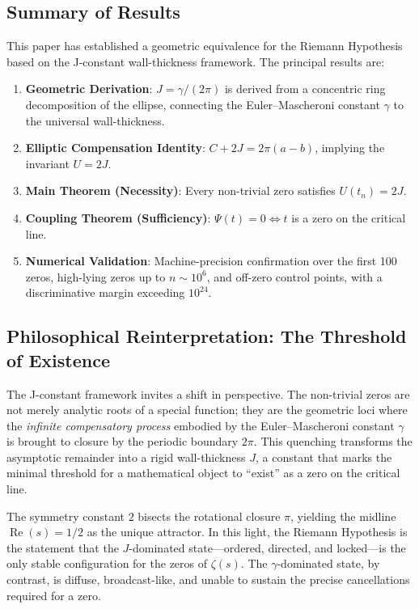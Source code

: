 \documentclass[11pt,a4paper]{article}
\theoremstyle{definition}
\begin{document}
\subsection{Summary of Results}
This paper has established a geometric equivalence for the Riemann Hypothesis based on the J-constant wall-thickness framework. 
The principal results are:
\begin{enumerate}
    \item \textbf{Geometric Derivation}: \(J = \gamma/(2\pi)\) is derived from a concentric ring decomposition of the ellipse, connecting the Euler--Mascheroni constant \(\gamma\) to the universal wall-thickness.
    \item \textbf{Elliptic Compensation Identity}: \(C + 2J = 2\pi(a-b)\), implying the invariant \(U = 2J\).
    \item \textbf{Main Theorem (Necessity)}: Every non-trivial zero satisfies \(U(t_n) = 2J\).
    \item \textbf{Coupling Theorem (Sufficiency)}: \(\Psi(t) = 0 \iff t\) is a zero on the critical line.
    \item \textbf{Numerical Validation}: Machine-precision confirmation over the first 100 zeros, high-lying zeros up to \(n \sim 10^6\), and off-zero control points, with a discriminative margin exceeding \(10^{24}\).
\end{enumerate}

\subsection{Philosophical Reinterpretation: The Threshold of Existence}
The J-constant framework invites a shift in perspective. 
The non-trivial zeros are not merely analytic roots of a special function; they are the geometric loci where the \emph{infinite compensatory process} embodied by the Euler--Mascheroni constant \(\gamma\) is brought to closure by the periodic boundary \(2\pi\). 
This quenching transforms the asymptotic remainder into a rigid wall-thickness \(J\), a constant that marks the minimal threshold for a mathematical object to ``exist'' as a zero on the critical line.

The symmetry constant \(2\) bisects the rotational closure \(\pi\), yielding the midline \(\operatorname{Re}(s)=1/2\) as the unique attractor. 
In this light, the Riemann Hypothesis is the statement that the \(J\)-dominated state---ordered, directed, and locked---is the only stable configuration for the zeros of \(\zeta(s)\). 
The \(\gamma\)-dominated state, by contrast, is diffuse, broadcast-like, and unable to sustain the precise cancellations required for a zero.
\end{document}
